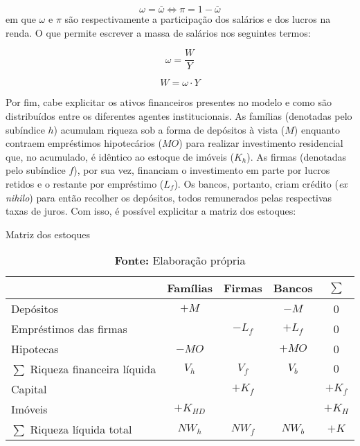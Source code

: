 \begin{equation}
    \omega = \overline{\omega} \Leftrightarrow \pi = 1 - \overline{\omega}
\end{equation}
em que $\omega$ e $\pi$ são respectivamente a participação dos salários e dos lucros na renda. O que permite escrever a massa de salários nos seguintes termos:

$$
\omega = \frac{W}{Y}
$$

\begin{equation}
\label{_W}
    W = \omega\cdot Y
\end{equation}

Por fim, cabe explicitar os ativos financeiros presentes no modelo e como são distribuídos entre os diferentes agentes institucionais. As famílias (denotadas pelo subíndice $h$) acumulam riqueza sob a forma de depósitos à vista ($M$) enquanto contraem empréstimos hipotecários ($MO$) para realizar investimento residencial que, no acumulado, é idêntico ao estoque de imóveis ($K_h$). 
As firmas (denotadas pelo subíndice $f$), por sua vez, financiam o investimento em parte por lucros retidos e o restante por empréstimo ($L_f$). Os bancos, portanto, criam crédito (\textit{ex nihilo}) para então recolher os depósitos, todos remunerados pelas respectivas taxas de juros. Com isso, é possível explicitar a matriz dos estoques:


\begin{table}[H]
\centering
\caption{Matriz dos estoques}
\begin{tabular}{lcccc}
\hline
\hline


                          & Famílias      & Firmas        & Bancos  &    $\sum$ \\ \hline

Depósitos & $+M$ & & $-M$ & 0\\
Empréstimos das firmas & &$-L_f$& $+L_f$ & 0\\
Hipotecas &$-MO$&  & $+MO$ & 0\\\hline
$\sum$ Riqueza financeira líquida &$V_h$&$V_f$&$V_b$& $0$\\\hline
Capital & &$+K_f$&  & $+K_f$\\
Imóveis &$+K_{HD}$& &   & $+K_{H}$\\\hline
$\sum$ Riqueza líquida total&$NW_h$&$NW_f$&$NW_b$& $+K$\\
\hline
\hline
\end{tabular}%
\caption*{\textbf{Fonte:} Elaboração própria}
\end{table}

